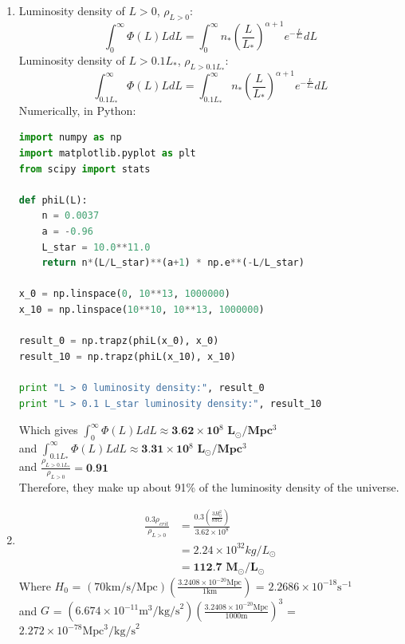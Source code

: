 \documentclass[10pt,letterpaper]{article}
\begin{document}
\begin{enumerate}
\begin{enumerate}
\item Luminosity density of $L > 0$, $\rho_{L>0}$:
\begin{equation}\nonumber
\int_{0}^{\infty} \Phi (L) L dL = \int_{0}^{\infty} n_* \left(\frac{L}{L_*}\right)^{\alpha+1} e^{-\frac{L}{L_*}} dL
\end{equation}
Luminosity density of $L > 0.1 L_*$, $\rho_{L>0.1L_*}$:
\begin{equation}\nonumber
\int_{0.1L_*}^{\infty} \Phi (L) L dL = \int_{0.1L_*}^{\infty} n_* \left(\frac{L}{L_*}\right)^{\alpha+1} e^{-\frac{L}{L_*}} dL
\end{equation}
Numerically, in Python:
\begin{lstlisting}[language=Python]
import numpy as np
import matplotlib.pyplot as plt
from scipy import stats

def phiL(L):
    n = 0.0037
    a = -0.96
    L_star = 10.0**11.0
    return n*(L/L_star)**(a+1) * np.e**(-L/L_star)

x_0 = np.linspace(0, 10**13, 1000000)
x_10 = np.linspace(10**10, 10**13, 1000000)

result_0 = np.trapz(phiL(x_0), x_0)
result_10 = np.trapz(phiL(x_10), x_10)
    
print "L > 0 luminosity density:", result_0
print "L > 0.1 L_star luminosity density:", result_10
\end{lstlisting}
Which gives $\int_{0}^{\infty} \Phi (L) L dL \approx \textbf{3.62$\times$10$^{8}$ L$_\odot$/Mpc$^3$}$\\

and $\int_{0.1 L_*}^{\infty} \Phi (L) L dL \approx \textbf{3.31$\times$10$^{8}$ L$_\odot$/Mpc$^3$}$\\

and $\frac{\rho_{L>0.1L_*}}{\rho_{L>0}} = \textbf{0.91}$\\

Therefore, they make up about 91\% of the luminosity density of the universe.

\item \begin{equation}\nonumber
\begin{split}
\frac{0.3 \rho_{crit}}{\rho_{L>0}} & = \frac{0.3\left(\frac{3H_0^2}{8 \pi G}\right)}{3.62\times10^{8}}\\
 & = 2.24 \times 10^{32} kg/L_\odot\\
 & = \textbf{112.7 M$_\odot$/L$_\odot$}
\end{split}
\end{equation}
Where $H_0$ = $(70\text{km/s/Mpc})(\frac{3.2408\times10^{-20}\text{Mpc}}{1\text{km}})$ = $2.2686\times10^{-18}\text{s}^{-1}$ \\
and $G$ = $(6.674\times10^{-11}\text{m}^3\text{/kg/s}^2)(\frac{3.2408\times10^{-20}\text{Mpc}}{1000\text{m}})^3$ = $2.272\times10^{-78}\text{Mpc}^3\text{/kg/s}^2$\\


\end{enumerate}
\end{enumerate}
\end{document}

